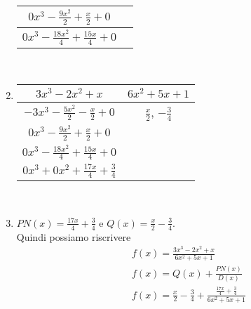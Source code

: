 \documentclass[11pt]{article}
\begin{document}
\begin{enumerate}
\begin{tabular}{c|c}
        \hline
        $0x^3 -\frac{9x^{2}}{2} + \frac{x}{2} + 0$ & \\
        \hline
        $0x^3 -\frac{18x^{2}}{4} + \frac{15x}{4} + 0$ & \\
    \end{tabular}\\
    \item \begin{tabular}{c|c}
        $3x^3-2x^2+x$ & $6x^2+5x+1$\\
        \hline
        $-3x^3 -\frac{5x^{2}}{2} - \frac{x}{2} + 0$ & $\frac{x}{2}$, $-\frac{3}{4}$\\
        \hline
        $0x^3 -\frac{9x^{2}}{2} + \frac{x}{2} + 0$ & \\
        \hline
        $0x^3 -\frac{18x^{2}}{4} + \frac{15x}{4} + 0$ & \\
        \hline
        $0x^3 + 0x^{2} + \frac{17x}{4} + \frac{3}{4}$ & \\
    \end{tabular}\\
    \item $PN(x) = \frac{17x}{4} + \frac{3}{4}$ e $Q(x) = \frac{x}{2} - \frac{3}{4}$.\\
    Quindi possiamo riscrivere
    \begin{align*}
        &f(x) = \frac{3x^3-2x^2+x}{6x^2+5x+1}\\
        &f(x) = Q(x) + \frac{PN(x)}{D(x)}\\
        &f(x) = \frac{x}{2} - \frac{3}{4} + \frac{\frac{17x}{4} + \frac{3}{4}}{6x^2+5x+1}
    \end{align*} 
\end{enumerate}
\end{document}
